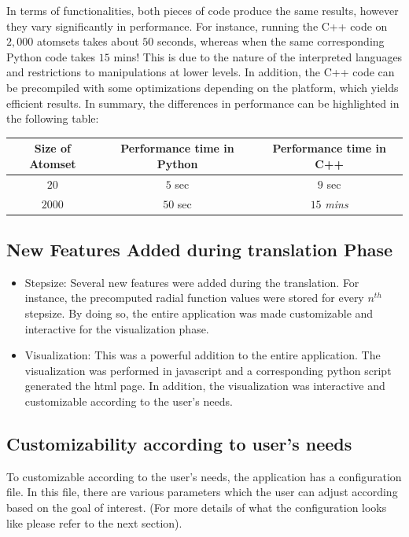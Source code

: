In terms of functionalities, both pieces of code produce the same results, however they vary significantly in performance. For instance, running the C++ code on $2,000$ atomsets takes about $50$ seconds, whereas when the same corresponding Python code takes $15$ mins! This is due to the nature of the interpreted languages and restrictions to manipulations at lower levels. In addition, the C++ code can be precompiled with some optimizations depending on the platform, which yields efficient results. In summary, the differences in performance can be highlighted in the following table:

\begin{center}
\begin{tabular}{ |c|c|c| } 
\hline
 Size of Atomset & Performance time in Python & Performance time in C++  \\
 \hline
 $20$ & $5$ sec & $9$ sec \\ 
 \hline
 $2000$ & $50$ sec & $15$ \textit{mins} \\ 
 \hline
\end{tabular}
\end{center}


\subsection*{New Features Added during translation Phase}

\begin{itemize}

\item Stepsize: Several new features were added during the translation. For instance, the precomputed radial function values were stored for every $n^{th}$ stepsize. By doing so, the entire application was made customizable and interactive for the visualization phase. 

\item Visualization: This was a powerful addition to the entire application. The visualization was performed in javascript and a corresponding python script generated the html page. In addition, the visualization was interactive and customizable according to the user's needs.

\end{itemize}

\subsection*{Customizability according to user's needs}

To customizable according to the user's needs, the application has a configuration file. In this file, there are various parameters which the user can adjust according based on the goal of interest. (For more details of what the configuration looks like please refer to the next section).